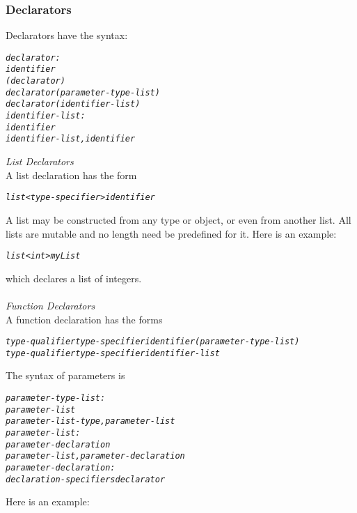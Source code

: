 \documentclass[12pt]{report}
\begin{document}
\subsubsection{Declarators}
Declarators have the syntax:
\begin{alltt}
         \textit{declarator:}
              \textit{identifier}
              \textit{( declarator )}
              \textit{declarator ( parameter-type-list )}
              \textit{declarator ( identifier-list )}
         \textit{identifier-list:}
              \textit{identifier}
              \textit{identifier-list, identifier}
\end{alltt}
\begin{doublespace}
\textit{List Declarators}\\
A list declaration has the form
\begin{alltt}
         \textit{list<type-specifier> identifier}
\end{alltt}
A list  may be constructed from any type or object, or even from another list. All lists are mutable and no length need be predefined for it. Here is an example:
\begin{alltt}
         \textit{list<int> myList}
\end{alltt}
which declares a list of integers.\\
\\
\textit{Function Declarators}\\
A function declaration has the forms
\begin{singlespace}
\begin{alltt}
    \textit{type-qualifier type-specifier identifier ( parameter-type-list )}
    \textit{type-qualifier type-specifier identifier-list}
\end{alltt}
\end{singlespace}
The syntax of parameters is
\begin{singlespace}
\begin{alltt}
         \textit{parameter-type-list:}
              \textit{parameter-list}
              \textit{parameter-list-type , parameter-list}
         \textit{parameter-list:}
              \textit{parameter-declaration}
              \textit{parameter-list , parameter-declaration}
         \textit{parameter-declaration:}
              \textit{declaration-specifiers declarator}
\end{alltt}
\end{singlespace}
Here is an example:
\begin{singlespace}
\begin{lstlisting}[language=Java,label=some-code,caption=foo declaration]

\end{lstlisting}
\end{singlespace}
\end{doublespace}
\end{document}
